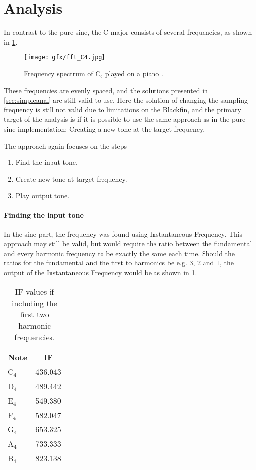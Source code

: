 
\section{Analysis}
In contrast to the pure sine, the C-major consists of several frequencies, as shown in \cref{fig:fftc4}.

\begin{figure}
	\centering
	\texttt{[image: gfx/fft\_C4.jpg]}
	\caption{Frequency spectrum of C$_4$ played on a piano \cite{fft_c4}.}
	\label{fig:fftc4}
\end{figure}

These frequencies are evenly spaced, and the solutions presented in \cref{sec:simpleanal} are still valid to use.
Here the solution of changing the sampling frequency is still not valid due to limitations on the Blackfin, and the primary target of the analysis is if it is possible to use the same approach as in the pure sine implementation: Creating a new tone at the target frequency.

The approach again focuses on the steps
\begin{enumerate}
	\item Find the input tone.
	\item Create new tone at target frequency.
	\item Play output tone.
\end{enumerate}

\paragraph{Finding the input tone}
In the sine part, the frequency was found using Instantaneous Frequency.
This approach may still be valid, but would require the ratio between the fundamental and every harmonic frequency to be exactly the same each time.
Should the ratios for the fundamental and the first to harmonics be e.g. 3, 2 and 1, the output of the Instantaneous Frequency would be as shown in \cref{tab:CmajorIF}.

\begin{table}
	\centering
	\begin{tabular}{l c}
		\toprule
		Note & IF \\
		\midrule
		C$_4$ & \num{436.043} \\
		D$_4$ & \num{489.442} \\
		E$_4$ & \num{549.380} \\
		F$_4$ & \num{582.047} \\
		G$_4$ & \num{653.325} \\
		A$_4$ & \num{733.333} \\
		B$_4$ & \num{823.138} \\
		\bottomrule
	\end{tabular}
	\caption{IF values if including the first two harmonic frequencies.}
	\label{tab:CmajorIF}
\end{table}

